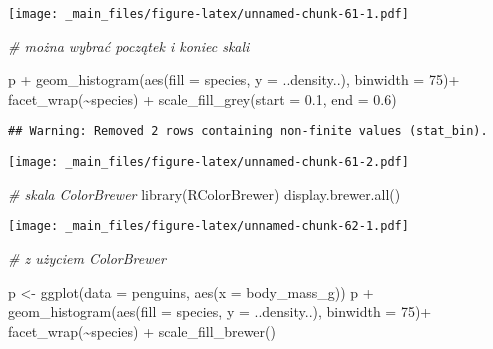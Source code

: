 \documentclass[
]{book}
\newenvironment{Shaded}{\begin{snugshade}}{\end{snugshade}}
\newcommand{\AttributeTok}[1]{\textcolor[rgb]{0.77,0.63,0.00}{#1}}
\newcommand{\CommentTok}[1]{\textcolor[rgb]{0.56,0.35,0.01}{\textit{#1}}}
\newcommand{\DecValTok}[1]{\textcolor[rgb]{0.00,0.00,0.81}{#1}}
\newcommand{\FloatTok}[1]{\textcolor[rgb]{0.00,0.00,0.81}{#1}}
\newcommand{\FunctionTok}[1]{\textcolor[rgb]{0.00,0.00,0.00}{#1}}
\newcommand{\NormalTok}[1]{#1}
\newcommand{\OtherTok}[1]{\textcolor[rgb]{0.56,0.35,0.01}{#1}}
\newcommand{\SpecialCharTok}[1]{\textcolor[rgb]{0.00,0.00,0.00}{#1}}
\begin{document}
\texttt{[image: \_main\_files/figure-latex/unnamed-chunk-61-1.pdf]}

\begin{Shaded}
\begin{Highlighting}[]
\CommentTok{\# można wybrać początek i koniec skali}

\NormalTok{p }\SpecialCharTok{+} \FunctionTok{geom\_histogram}\NormalTok{(}\FunctionTok{aes}\NormalTok{(}\AttributeTok{fill =}\NormalTok{ species, }\AttributeTok{y =}\NormalTok{ ..density..), }\AttributeTok{binwidth =} \DecValTok{75}\NormalTok{)}\SpecialCharTok{+}
  \FunctionTok{facet\_wrap}\NormalTok{(}\SpecialCharTok{\textasciitilde{}}\NormalTok{species) }\SpecialCharTok{+} \FunctionTok{scale\_fill\_grey}\NormalTok{(}\AttributeTok{start =} \FloatTok{0.1}\NormalTok{, }\AttributeTok{end =} \FloatTok{0.6}\NormalTok{)}
\end{Highlighting}
\end{Shaded}

\begin{verbatim}
## Warning: Removed 2 rows containing non-finite values (stat_bin).
\end{verbatim}

\texttt{[image: \_main\_files/figure-latex/unnamed-chunk-61-2.pdf]}

\begin{Shaded}
\begin{Highlighting}[]
\CommentTok{\# skala ColorBrewer}
\FunctionTok{library}\NormalTok{(RColorBrewer)}
\FunctionTok{display.brewer.all}\NormalTok{()}
\end{Highlighting}
\end{Shaded}

\texttt{[image: \_main\_files/figure-latex/unnamed-chunk-62-1.pdf]}

\begin{Shaded}
\begin{Highlighting}[]
\CommentTok{\# z użyciem ColorBrewer}

\NormalTok{p }\OtherTok{\textless{}{-}} \FunctionTok{ggplot}\NormalTok{(}\AttributeTok{data =}\NormalTok{ penguins, }\FunctionTok{aes}\NormalTok{(}\AttributeTok{x =}\NormalTok{ body\_mass\_g))}
\NormalTok{p }\SpecialCharTok{+} \FunctionTok{geom\_histogram}\NormalTok{(}\FunctionTok{aes}\NormalTok{(}\AttributeTok{fill =}\NormalTok{ species, }\AttributeTok{y =}\NormalTok{ ..density..), }\AttributeTok{binwidth =} \DecValTok{75}\NormalTok{)}\SpecialCharTok{+}
  \FunctionTok{facet\_wrap}\NormalTok{(}\SpecialCharTok{\textasciitilde{}}\NormalTok{species) }\SpecialCharTok{+} \FunctionTok{scale\_fill\_brewer}\NormalTok{()}
\end{Highlighting}
\end{Shaded}
\end{document}
